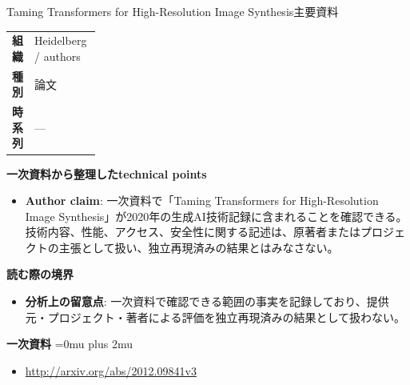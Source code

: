 \begin{technicalnote}{Taming Transformers for High-Resolution Image Synthesis}{主要資料}
\begingroup
\begin{tabularx}{\linewidth}{@{}>{\bfseries}p{0.22\linewidth}X@{}}
組織 & Heidelberg / authors \\
種別 & 論文 \\
時系列 & — \\
\end{tabularx}
\smallskip
{\bfseries 一次資料から整理したtechnical points}
\begin{itemize}[leftmargin=1.5em,itemsep=0.35em]
\item \textbf{Author claim}: 一次資料で「Taming Transformers for High-Resolution Image Synthesis」が2020年の生成AI技術記録に含まれることを確認できる。技術内容、性能、アクセス、安全性に関する記述は、原著者またはプロジェクトの主張として扱い、独立再現済みの結果とはみなさない。
\end{itemize}
\begin{minipage}{\linewidth}
{\bfseries 読む際の境界}
\begin{itemize}[leftmargin=1.5em,itemsep=0.35em]
\item \textbf{分析上の留意点}: 一次資料で確認できる範囲の事実を記録しており、提供元・プロジェクト・著者による評価を独立再現済みの結果として扱わない。
\end{itemize}
\begin{samepage}
{\bfseries 一次資料}
\begingroup\sloppy
\Urlmuskip=0mu plus 2mu\relax
\begin{itemize}[leftmargin=1.5em,itemsep=0.25em]
\item {\scriptsize\url{http://arxiv.org/abs/2012.09841v3}}
\end{itemize}
\endgroup
\end{samepage}
\end{minipage}
\endgroup
\end{technicalnote}
\medskip
